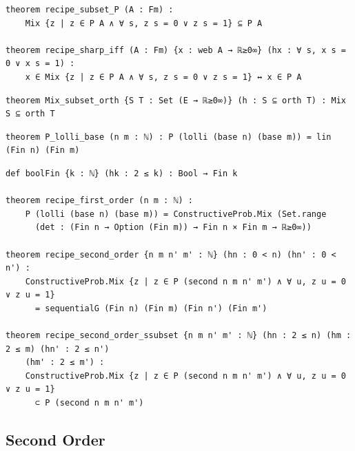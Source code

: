 \begin{lstlisting}
theorem recipe_subset_P (A : Fm) :
    Mix {z | z ∈ P A ∧ ∀ s, z s = 0 ∨ z s = 1} ⊆ P A

theorem recipe_sharp_iff (A : Fm) {x : web A → ℝ≥0∞} (hx : ∀ s, x s = 0 ∨ x s = 1) :
    x ∈ Mix {z | z ∈ P A ∧ ∀ s, z s = 0 ∨ z s = 1} ↔ x ∈ P A
\end{lstlisting}

\begin{lstlisting}
theorem Mix_subset_orth {S T : Set (E → ℝ≥0∞)} (h : S ⊆ orth T) : Mix S ⊆ orth T
\end{lstlisting}

\begin{lstlisting}
theorem P_lolli_base (n m : ℕ) : P (lolli (base n) (base m)) = lin (Fin n) (Fin m)
\end{lstlisting}

\begin{lstlisting}
def boolFin {k : ℕ} (hk : 2 ≤ k) : Bool → Fin k

theorem recipe_first_order (n m : ℕ) :
    P (lolli (base n) (base m)) = ConstructiveProb.Mix (Set.range
      (det : (Fin n → Option (Fin m)) → Fin n × Fin m → ℝ≥0∞))

theorem recipe_second_order {n m n' m' : ℕ} (hn : 0 < n) (hn' : 0 < n') :
    ConstructiveProb.Mix {z | z ∈ P (second n m n' m') ∧ ∀ u, z u = 0 ∨ z u = 1}
      = sequentialG (Fin n) (Fin m) (Fin n') (Fin m')

theorem recipe_second_order_ssubset {n m n' m' : ℕ} (hn : 2 ≤ n) (hm : 2 ≤ m) (hn' : 2 ≤ n')
    (hm' : 2 ≤ m') :
    ConstructiveProb.Mix {z | z ∈ P (second n m n' m') ∧ ∀ u, z u = 0 ∨ z u = 1}
      ⊂ P (second n m n' m')
\end{lstlisting}

\subsection{Second Order}

